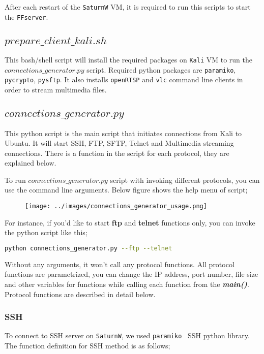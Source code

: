 \documentclass[a4paper]{article}
\begin{document}
After each restart of the \texttt{SaturnW} VM, it is required to run this scripts to start the \texttt{FFserver}.

\subsection{$prepare\_client\_kali.sh$}
This bash/shell script will install the required packages on \texttt{Kali} VM to run the $connections\_generator.py$ script. Required python packages are \texttt{paramiko}, \texttt{pycrypto}, \texttt{pysftp}. 
It also installs \texttt{openRTSP} and \texttt{vlc} command line clients in order to stream multimedia files.


\subsection{\texttt{$connections\_generator.py$}}
This python script is the main script that initiates connections from Kali to Ubuntu. 
It will start SSH, FTP, SFTP, Telnet and Multimedia streaming connections. 
There is a function in the script for each protocol, they are explained below.

To run $connections\_generator.py$ script with invoking different protocols, you can use the command line arguments.
Below figure shows the help menu of script;

\begin{figure}[ht]
\texttt{[image: ../images/connections\_generator\_usage.png]}
\label{fig:scripthelpmenu}
\end{figure}

For instance, if you'd like to start \textbf{ftp} and \textbf{telnet} functions only, you can invoke the python script like this;

\begin{lstlisting}[language=bash, basicstyle=\footnotesize, numbers=none]
python connections_generator.py --ftp --telnet
\end{lstlisting}

Without any arguments, it won't call any protocol functions. 
All protocol functions are parametrized, you can change the IP address, port number, file size and 
other variables for functions while calling each function from the \textit{\textbf{main()}}.
Protocol functions are described in detail below.

\subsubsection{SSH}
To connect to SSH server on \texttt{SaturnW}, we used \texttt{paramiko}~\cite{paramiko} SSH python library. 
The function definition for SSH method is as follows;
\end{document}
